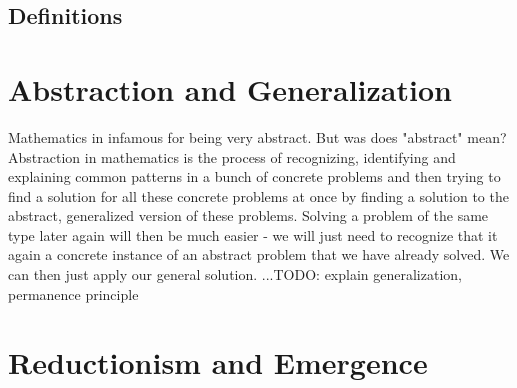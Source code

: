 \subsection{Definitions}




\section{Abstraction and Generalization}
Mathematics in infamous for being very abstract. But was does "abstract" mean? Abstraction in mathematics is the process of recognizing, identifying and explaining common patterns in a bunch of concrete problems and then trying to find a solution for all these concrete problems at once by finding a solution to the abstract, generalized version of these problems. Solving a problem of the same type later again will then be much easier - we will just need to recognize that it again a concrete instance of an abstract problem that we have already solved. We can then just apply our general solution. ...TODO: explain generalization, permanence principle




\section{Reductionism and Emergence}

